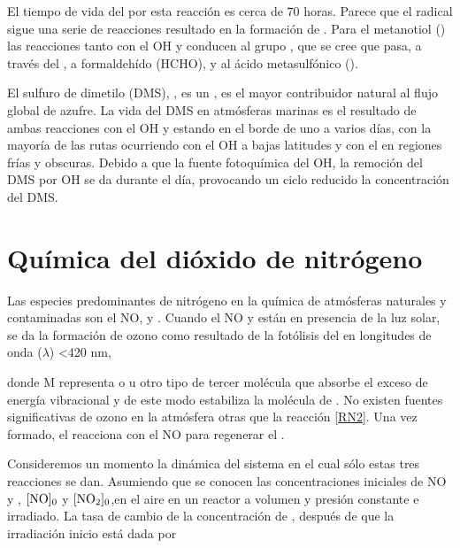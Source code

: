 El tiempo de vida del  por esta reacción es cerca de 70 horas. Parece que el radical  sigue una serie de reacciones resultado en la formación de  . Para el metanotiol () las reacciones tanto con el OH y  conducen al grupo , que se cree que pasa, a través del , a formaldehído (HCHO),   y al ácido metasulfónico ().

El sulfuro de dimetilo (DMS), , es un , es el mayor contribuidor natural al flujo global de azufre. La vida del DMS en atmósferas marinas es el resultado de ambas reacciones con el OH y  estando en el borde de uno a varios días, con la mayoría de las rutas ocurriendo con el OH a bajas latitudes y con el  en regiones frías  y obscuras. Debido a que la fuente fotoquímica del OH, la remoción del DMS por OH se da durante el día, provocando un ciclo reducido la concentración del DMS.


\section{Química del dióxido de nitrógeno}\label{qno2}
Las especies predominantes de nitrógeno en la química de atmósferas naturales y contaminadas son el NO,  y . 
Cuando el NO y   están en presencia de la luz solar, se da la formación de ozono como resultado de la fotólisis del   en longitudes de onda ($\lambda$) <420 nm,



donde M representa  o  u otro tipo de tercer molécula que absorbe el exceso de energía vibracional y de este modo estabiliza la molécula de . No existen fuentes significativas de ozono en la atmósfera otras que la reacción \ref{RN2}. Una vez formado, el  reacciona con el NO para regenerar el .


Consideremos un momento la dinámica del sistema en el cual sólo estas tres reacciones se dan. Asumiendo que se conocen las concentraciones iniciales de NO y , $[\ce{NO}]_0$ y $[\ce{NO2}]_0$,en el aire en un reactor a volumen y presión constante e irradiado. La tasa de cambio de la concentración de , después de que la irradiación inicio está dada por

